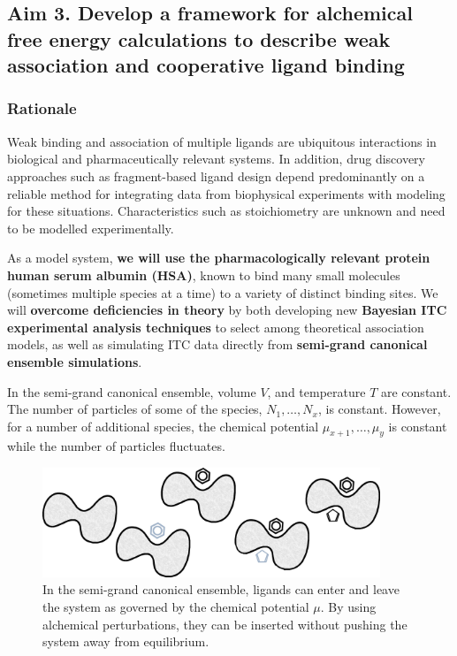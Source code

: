 \documentclass[10pt,final]{article}
\begin{document}

\subsection*{Aim 3. Develop a framework for alchemical free energy calculations to describe weak association and cooperative ligand binding}
\subsubsection*{Rationale}
Weak binding and association of multiple ligands are ubiquitous interactions in biological and pharmaceutically relevant systems.
In addition, drug discovery approaches such as fragment-based ligand design depend predominantly on a reliable method for integrating data from biophysical experiments with modeling for these situations. Characteristics such as stoichiometry are unknown and need to be modelled experimentally.

As a model system, \textbf{we will use the pharmacologically relevant protein human serum albumin (HSA)}, known to bind many small molecules (sometimes multiple species at a time) to a variety of distinct binding sites.
We will \textbf{overcome deficiencies in theory} by both developing new \textbf{Bayesian ITC experimental analysis techniques} to select among theoretical association models, as well as simulating ITC data directly from \textbf{semi-grand canonical ensemble simulations}.

In the semi-grand canonical ensemble,  volume $V$, and temperature $T$ are constant. The number of particles of some of the species, $N_1,\dots,N_x$, is constant. However, for a number of additional species, the chemical potential $\mu_{x+1},\dots,\mu_{y}$ is constant while the number of particles fluctuates.

\begin{figure}[H]
  \centering
  \includegraphics[width=0.9\textwidth]{figures/semi-grand.png}
  \caption{In the semi-grand canonical ensemble, ligands can enter and leave the system as governed by the chemical potential $\mu$. By using alchemical perturbations, they can be inserted without pushing the system away from equilibrium.}
  \label{figure:semigrand}
\end{figure}
\end{document}
